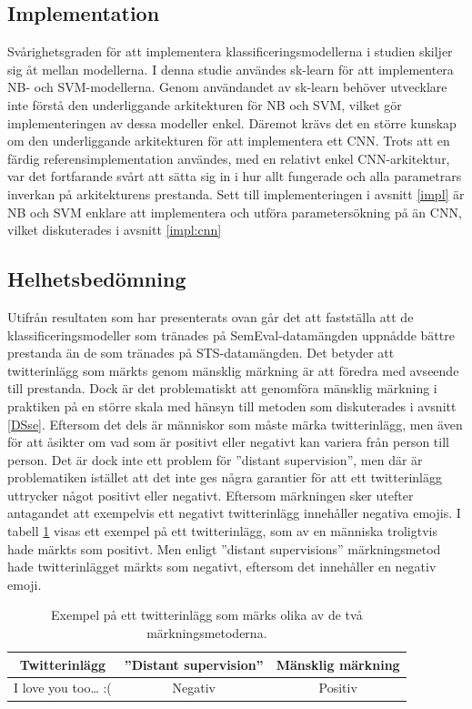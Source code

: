 \documentclass{kaumasters} %
\begin{document}
\subsection{Implementation}
Svårighetsgraden för att implementera klassificeringsmodellerna i studien skiljer sig åt mellan modellerna. I denna studie användes sk-learn för att implementera NB- och SVM-modellerna. Genom användandet av sk-learn behöver utvecklare inte förstå den underliggande arkitekturen för NB och SVM, vilket gör implementeringen av dessa modeller enkel. Däremot krävs det en större kunskap om den underliggande arkitekturen för att implementera ett CNN. Trots att en färdig referensimplementation användes, med en relativt enkel CNN-arkitektur, var det fortfarande svårt att sätta sig in i hur allt fungerade och alla parametrars inverkan på arkitekturens prestanda. Sett till implementeringen i avsnitt \ref{impl} är NB och SVM enklare att implementera och utföra parametersökning på än CNN, vilket diskuterades i avsnitt \ref{impl:cnn}
\subsection{Helhetsbedömning} \label{res:hhb}
Utifrån resultaten som har presenterats ovan går det att fastställa att de klassificeringsmodeller som tränades på SemEval-datamängden uppnådde bättre prestanda än de som tränades på STS-datamängden. Det betyder att twitterinlägg som märkts genom mänsklig märkning är att föredra med avseende till prestanda. Dock är det problematiskt att genomföra mänsklig märkning i praktiken på en större skala med hänsyn till metoden som diskuterades i avsnitt \ref{DSse}. Eftersom det dels är människor som måste märka twitterinlägg, men även för att åsikter om vad som är positivt eller negativt kan variera från person till person. Det är dock inte ett problem för ''distant supervision'', men där är problematiken istället att det inte ges några garantier för att ett twitterinlägg uttrycker något positivt eller negativt. Eftersom märkningen sker utefter antagandet att exempelvis ett negativt twitterinlägg innehåller negativa emojis. I tabell \ref{tab:exp_mark} visas ett exempel på ett twitterinlägg, som av en människa troligtvis hade märkts som positivt. Men enligt ''distant supervisions'' märkningsmetod  hade twitterinlägget märkts som negativt, eftersom det innehåller en negativ emoji.

\begin{table}[H]
\centering
\caption{Exempel på ett twitterinlägg som märks olika av de två märkningsmetoderna.}
\label{tab:exp_mark}
  \begin{tabular}{ccc}
  \toprule
  \textbf{Twitterinlägg} & \textbf{''Distant supervision''}  & \textbf{Mänsklig märkning} \\
  \midrule
  I love you too… :( & Negativ & Positiv \\
  \bottomrule
\end{tabular}
\end{table}
\end{document}
